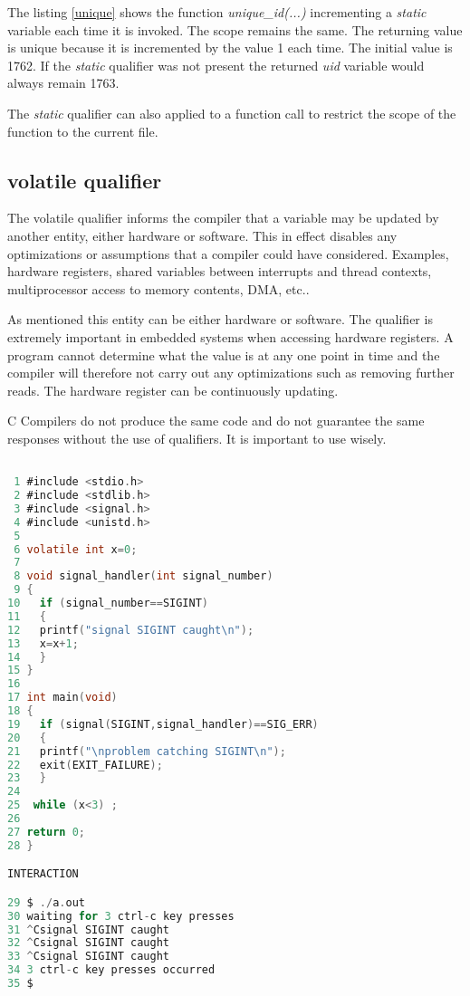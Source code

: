 The listing \ref{unique} shows the function \textit{unique\_id(...)} incrementing a \textit{static} variable each time it is invoked. The scope remains the same. The returning value is unique because it is incremented by the value 1 each time. The initial value is 1762. If the \textit{static} qualifier was not present the returned \textit{uid} variable would always remain 1763.

The \textit{static} qualifier can also applied to a function call to restrict the scope of the function to the current file.

\subsection{volatile qualifier}


The volatile qualifier informs the compiler that a variable may be updated by another entity, either hardware or software. This in effect disables any optimizations or assumptions that a compiler could have considered. Examples, hardware registers, shared variables between interrupts and thread contexts, multiprocessor access to memory contents, DMA, etc..

As mentioned this entity can be either hardware or software. The qualifier is extremely important in embedded systems when accessing hardware registers. A program cannot determine what the value is at any one point in time and the compiler will therefore not carry out any optimizations such as removing further reads. The hardware register can be continuously updating.

C Compilers do not produce the same code and do not guarantee the same responses without the use of qualifiers. It is important to use wisely.

\begin{lstlisting}[language=C,showstringspaces=false,caption={File volatile.c, volatile qualifier},captionpos=b,label=signal]

 1 #include <stdio.h>
 2 #include <stdlib.h>
 3 #include <signal.h>
 4 #include <unistd.h>
 5  
 6 volatile int x=0;
 7  
 8 void signal_handler(int signal_number)
 9 {
10   if (signal_number==SIGINT)
11   {
12   printf("signal SIGINT caught\n");
13   x=x+1;   
14   } 
15 }
16
17 int main(void)
18 {
19   if (signal(SIGINT,signal_handler)==SIG_ERR)
20   {
21   printf("\nproblem catching SIGINT\n");
22   exit(EXIT_FAILURE);
23   }
24   
25  while (x<3) ; 
26 
27 return 0;
28 }

INTERACTION

29 $ ./a.out
30 waiting for 3 ctrl-c key presses
31 ^Csignal SIGINT caught
32 ^Csignal SIGINT caught
33 ^Csignal SIGINT caught
34 3 ctrl-c key presses occurred
35 $

\end{lstlisting}

